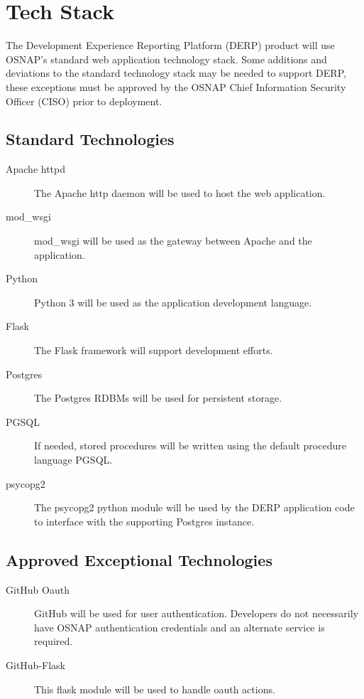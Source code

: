 \chapter*{Tech Stack}
The Development Experience Reporting Platform (DERP) product will use OSNAP's standard web application technology stack. Some additions and deviations to the standard technology stack may be needed to support DERP, these exceptions must be approved by the OSNAP Chief Information Security Officer (CISO) prior to deployment. 

\section*{Standard Technologies}
\begin{description}
\item[Apache httpd] The Apache http daemon will be used to host the web application.
\item[mod\_wsgi] mod\_wsgi will be used as the gateway between Apache and the application.
\item[Python] Python 3 will be used as the application development language.
\item[Flask] The Flask framework will support development efforts.
\item[Postgres] The Postgres RDBMs will be used for persistent storage.
\item[PGSQL] If needed, stored procedures will be written using the default procedure language PGSQL.
\item[psycopg2] The psycopg2 python module will be used by the DERP application code to interface with the supporting Postgres instance.
\end{description}


\section*{Approved Exceptional Technologies}
\begin{description}
\item[GitHub Oauth] GitHub will be used for user authentication. Developers do not necessarily have OSNAP authentication credentials and an alternate service is required.
\item[GitHub-Flask] This flask module will be used to handle oauth actions.
\end{description}


